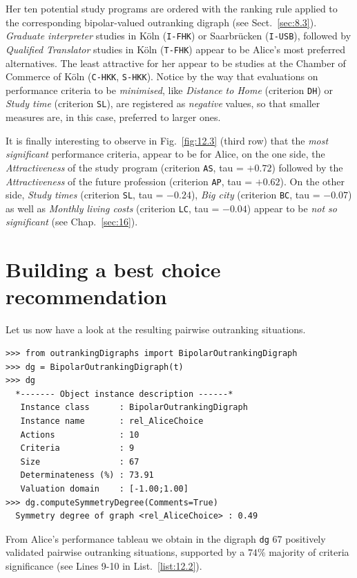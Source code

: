 Her ten potential study programs are ordered with the \NetFlows ranking rule applied to the corresponding bipolar-valued outranking digraph (see Sect.~\ref{sec:8.3}). \emph{Graduate interpreter} studies in Köln (\texttt{I-FHK}) or Saarbrücken (\texttt{I-USB}), followed by \emph{Qualified Translator} studies in Köln (\texttt{T-FHK}) appear to be Alice's most preferred alternatives. The least attractive for her appear to be studies at the Chamber of Commerce of Köln (\texttt{C-HKK}, \texttt{S-HKK}). Notice by the way that evaluations on performance criteria to be \emph{minimised}, like \emph{Distance to Home} (criterion \texttt{DH}) or \emph{Study time} (criterion \texttt{SL}), are registered as \emph{negative} values, so that smaller measures are, in this case, preferred to larger ones.

It is finally interesting to observe in Fig.~\vref{fig:12.3} (third row) that the \emph{most significant} performance criteria, appear to be for Alice, on the one side, the \emph{Attractiveness} of the study program (criterion \texttt{AS}, tau = $+0.72$) followed by the \emph{Attractiveness} of the future profession (criterion \texttt{AP}, tau = $+0.62$). On the other side, \emph{Study times} (criterion \texttt{SL}, tau = $-0.24$), \emph{Big city} (criterion \texttt{BC}, tau = $-0.07$) as well as \emph{Monthly living costs} (criterion \texttt{LC}, tau = $-0.04$) appear to be \emph{not so significant} (see Chap.~\ref{sec:16}).

\section{Building a best choice recommendation}
\label{sec:12.3}

Let us now have a look at the resulting pairwise outranking situations.
\begin{lstlisting}[caption={Computing Alice's outranking digraph},label=list:12.2]
>>> from outrankingDigraphs import BipolarOutrankingDigraph
>>> dg = BipolarOutrankingDigraph(t) 
>>> dg
  *------- Object instance description ------*
   Instance class      : BipolarOutrankingDigraph
   Instance name       : rel_AliceChoice
   Actions             : 10
   Criteria            : 9
   Size                : 67
   Determinateness (%) : 73.91
   Valuation domain    : [-1.00;1.00]
>>> dg.computeSymmetryDegree(Comments=True)
  Symmetry degree of graph <rel_AliceChoice> : 0.49
\end{lstlisting}

From Alice's performance tableau we obtain in the digraph \texttt{dg}  67 positively validated pairwise outranking situations, supported by a $74\%$ majority of criteria significance (see Lines 9-10 in List.~\vref{list:12.2}).

